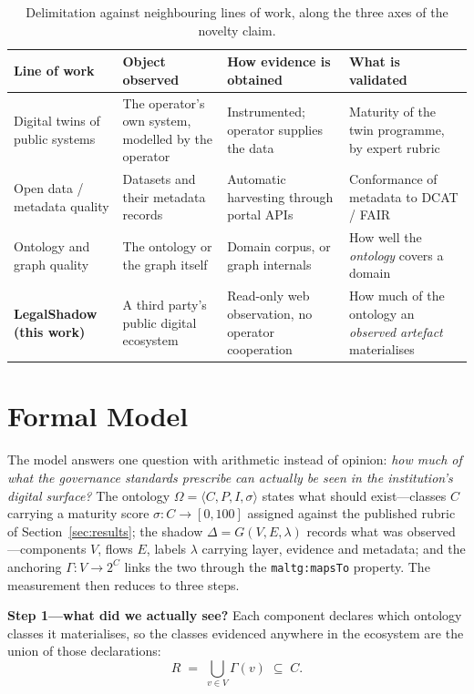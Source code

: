\documentclass[engproc,proceedingpaper,submit,moreauthors]{Definitions/mdpi}
\begin{document}
\begin{table}[H]
\small
\caption{Delimitation against neighbouring lines of work, along the three axes of the novelty claim.\label{tab:related}}
\begin{tabularx}{\textwidth}{p{2.9cm}XXX}
\toprule
\textbf{Line of work} & \textbf{Object observed} & \textbf{How evidence is obtained} & \textbf{What is validated}\\
\midrule
Digital twins of public systems \cite{Haraguchi2024,DiazSarachaga2025,Anshari2022}
 & The operator's own system, modelled by the operator
 & Instrumented; operator supplies the data
 & Maturity of the twin programme, by expert rubric\\[2pt]
Open data / metadata quality \cite{Neumaier2016,Kubler2018,Vetro2016}
 & Datasets and their metadata records
 & Automatic harvesting through portal APIs
 & Conformance of metadata to DCAT / FAIR\\[2pt]
Ontology and graph quality \cite{Zaitoun2023,AbadNavarro2025,Seo2022}
 & The ontology or the graph itself
 & Domain corpus, or graph internals
 & How well the \emph{ontology} covers a domain\\[2pt]
\textbf{LegalShadow (this work)}
 & A third party's public digital ecosystem
 & Read-only web observation, no operator cooperation
 & How much of the ontology an \emph{observed artefact} materialises\\
\bottomrule
\end{tabularx}
\end{table}

\section{Formal Model}
\label{sec:formal}
    The model answers one question with arithmetic instead of opinion: \emph{how much of what the governance standards prescribe can actually be seen in the institution's digital surface?} The ontology $\Omega=\langle C,P,I,\sigma\rangle$ states what should exist---classes $C$ carrying a maturity score $\sigma:C\to[0,100]$ assigned against the published rubric of Section~\ref{sec:results}; the shadow $\Delta=G(V,E,\lambda)$ records what was observed---components $V$, flows $E$, labels $\lambda$ carrying layer, evidence and metadata; and the anchoring $\Gamma:V\to 2^{C}$ links the two through the \texttt{maltg:mapsTo} property. The measurement then reduces to three steps.

    \textbf{Step 1---what did we actually see?} Each component declares which ontology classes it materialises, so the classes evidenced anywhere in the ecosystem are the union of those declarations:
\begin{equation}
R \;=\; \bigcup_{v \in V} \Gamma(v) \;\subseteq\; C .
\label{eq:coverage-set}
\end{equation}
\end{document}
